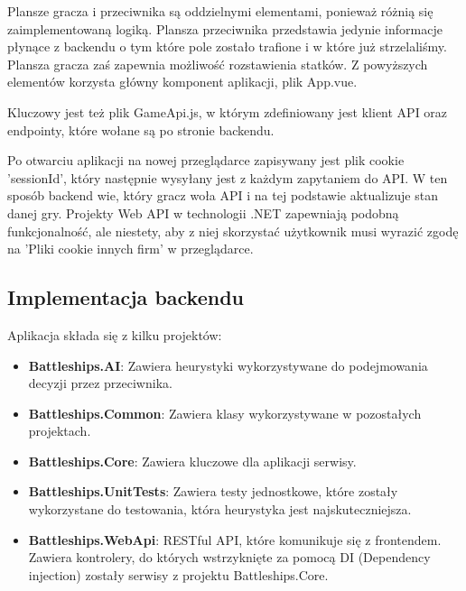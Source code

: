 Plansze gracza i przeciwnika są oddzielnymi elementami, ponieważ różnią się zaimplementowaną logiką. Plansza przeciwnika przedstawia jedynie informacje płynące z backendu o tym które pole zostało trafione i w które już strzelaliśmy. Plansza gracza zaś zapewnia możliwość rozstawienia statków. Z powyższych elementów korzysta główny komponent aplikacji, plik App.vue.

Kluczowy jest też plik GameApi.js, w którym zdefiniowany jest klient API oraz endpointy, które wołane są po stronie backendu.

Po otwarciu aplikacji na nowej przeglądarce zapisywany jest plik cookie 'sessionId', który następnie wysyłany jest z każdym zapytaniem do API. W ten sposób backend wie, który gracz woła API i na tej podstawie aktualizuje stan danej gry. Projekty Web API w technologii .NET zapewniają podobną funkcjonalność, ale niestety, aby z niej skorzystać użytkownik musi wyrazić zgodę na 'Pliki cookie innych firm' w przeglądarce. 

\subsection{Implementacja backendu}
\indent Aplikacja składa się z kilku projektów:
\begin{itemize}
    \item \textbf{Battleships.AI}: Zawiera heurystyki wykorzystywane do podejmowania decyzji przez przeciwnika.
    \item \textbf{Battleships.Common}: Zawiera klasy wykorzystywane w pozostałych projektach.
    \item \textbf{Battleships.Core}: Zawiera kluczowe dla aplikacji serwisy.
    \item \textbf{Battleships.UnitTests}: Zawiera testy jednostkowe, które zostały wykorzystane do testowania, która heurystyka jest najskuteczniejsza.
    \item \textbf{Battleships.WebApi}: RESTful API, które komunikuje się z frontendem. Zawiera kontrolery, do których wstrzyknięte za pomocą DI (Dependency injection) zostały serwisy z projektu Battleships.Core.
\end{itemize}

